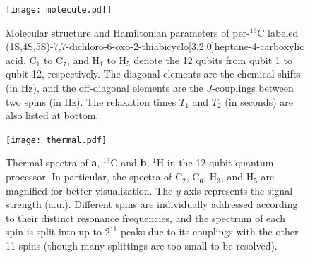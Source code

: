\documentclass[twocolumn,reprint, amsmath,amssymb,showpacs,superscriptaddress]{revtex4-1}
\begin{document}
\author{Jonathan Baugh}

\author{Bei Zeng}


\author{Raymond Laflamme}

\maketitle

\begin{figure}
\begin{center}
\texttt{[image: molecule.pdf]}
\end{center}
\setcounter{figure}{0}
\makeatletter
\renewcommand{\thefigure}{S\@arabic\c@figure}
\makeatother
\caption{Molecular structure and Hamiltonian parameters of per-$^{13}$C labeled (1S,4S,5S)-7,7-dichloro-6-oxo-2-thiabicyclo[3.2.0]heptane-4-carboxylic acid. C$_1$ to C$_7$, and H$_1$ to H$_5$ denote the 12 qubits from qubit 1 to qubit 12, respectively. The diagonal elements are the chemical shifts (in Hz), and the off-diagonal elements are the $J$-couplings between two spins (in Hz). The relaxation times $T_{1}$ and $T_{2}$ (in seconds) are also listed at bottom.}
\label{molecule}
\end{figure}

\appendix

\begin{figure}[t]
\begin{center}
\texttt{[image: thermal.pdf]}
\end{center}
\makeatletter
\renewcommand{\thefigure}{S\@arabic\c@figure}
\makeatother
\caption{Thermal spectra of \textbf{a}, $^{13}$C and \textbf{b}, $^1$H in the 12-qubit quantum processor. In particular, the spectra of C$_2$, C$_6$, H$_3$, and H$_5$ are magnified for better visualization. The $y$-axis represents the signal strength (a.u.). Different spins are individually addressed according to their distinct resonance frequencies, and the spectrum of each spin is split into up to $2^{11}$ peaks due to its couplings with the other 11 spins (though many splittings are too small to be resolved).}
\label{thermal}
\end{figure}
\end{document}
